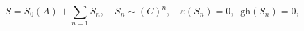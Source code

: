 \begin{equation*}
S=S_{0}(A)+\sum_{n=1}S_{n},\quad S_{n}\sim (C)^{n},\quad \varepsilon
(S_{n})=0,\;\;\mathrm{gh}(S_{n})=0,
\end{equation*}

